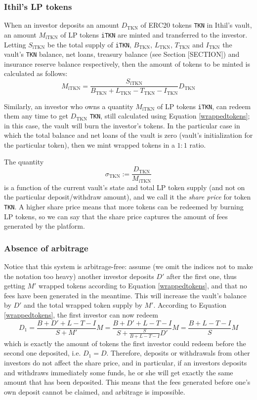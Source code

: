 \documentclass[a4paper,10 pt]{article}
\theoremstyle{definition}
\begin{document}
\subsubsection{Ithil's LP tokens}
When an investor deposits an amount $D_{\text{TKN}}$ of ERC20 tokens \verb|TKN| in Ithil's vault, an amount $M_{\text{iTKN}}$ of LP tokens \verb|iTKN| are minted and transferred to the investor. Letting $S_{\text{iTKN}}$ be the total supply of \verb|iTKN|, $B_{\text{TKN}}$, $L_{\text{TKN}}$, $T_{\text{TKN}}$ and $I_{\text{TKN}}$ the vault's \verb|TKN| balance, net loans, treasury balance (see Section [SECTION]) and insurance reserve balance respectively, then the amount of tokens to be minted is calculated as follows:
\begin{equation}\label{wrappedtokens}M_{\text{iTKN}} = \frac{S_{\text{iTKN}}}{B_{\text{TKN}} + L_{\text{TKN}} - T_{\text{TKN}} - I_{\text{TKN}}}D_{\text{TKN}}\end{equation}

Similarly, an investor who owns a quantity $M_{\text{iTKN}}$ of LP tokens \verb|iTKN|, can redeem them any time to get $D_{\text{TKN}}$ \verb|TKN|, still calculated using Equation \eqref{wrappedtokens}; in this case, the vault will burn the investor's tokens. In the particular case in which the total balance and net loans of the vault is zero (vault's initialization for the particular token), then we mint wrapped tokens in a $1:1$ ratio.

The quantity $$\sigma_{\text{TKN}} := \frac{D_{\text{TKN}}}{M_{\text{iTKN}}}$$ is a function of the current vault's state and total LP token supply (and not on the particular deposit/withdraw amount), and we call it the {\it share price} for token \verb|TKN|. A higher share price means that more tokens can be redeemed by burning LP tokens, so we can say that the share price captures the amount of fees generated by the platform.

\subsubsection{Absence of arbitrage}
Notice that this system is arbitrage-free: assume (we omit the indices not to make the notation too heavy) another investor deposits $D'$ after the first one, thus getting $M'$ wrapped tokens according to Equation \eqref{wrappedtokens}, and that no fees have been generated in the meantime. This will increase the vault's balance by $D'$ and the total wrapped token supply by $M'$. According to Equation \eqref{wrappedtokens}, the first investor can now redeem
\begin{equation}D_1 = \frac{B+D'+L-T-I}{S+M'}M = \frac{B+D'+L-T-I}{S+\frac{S}{B+L-T-I}D'}M = \frac{B+L-T-I}{S}M \end{equation}
which is exactly the amount of tokens the first investor could redeem before the second one deposited, i.e. $D_1 = D$. Therefore, deposits or withdrawals from other investors do not affect the share price, and in particular, if an investors deposits and withdraws immediately some funds, he or she will get exactly the same amount that has been deposited. This means that the fees generated before one's own deposit cannot be claimed, and arbitrage is impossible.
\end{document}
